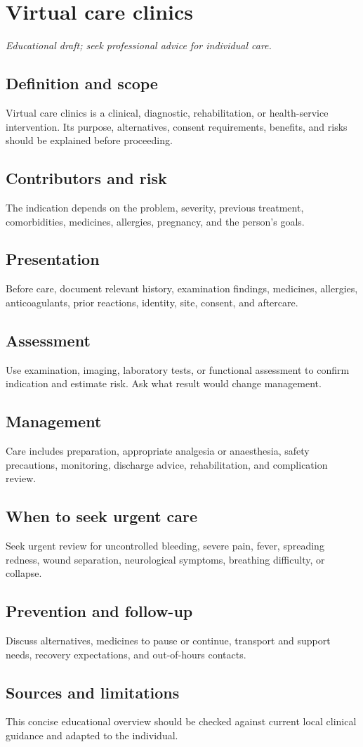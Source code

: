 \chapter{Virtual care clinics}
\medskip
\noindent\textit{Educational draft; seek professional advice for individual care.}

\section*{Definition and scope}
Virtual care clinics is a clinical, diagnostic, rehabilitation, or health-service intervention. Its purpose, alternatives, consent requirements, benefits, and risks should be explained before proceeding.

\section*{Contributors and risk}
The indication depends on the problem, severity, previous treatment, comorbidities, medicines, allergies, pregnancy, and the person’s goals.

\section*{Presentation}
Before care, document relevant history, examination findings, medicines, allergies, anticoagulants, prior reactions, identity, site, consent, and aftercare.

\section*{Assessment}
Use examination, imaging, laboratory tests, or functional assessment to confirm indication and estimate risk. Ask what result would change management.

\section*{Management}
Care includes preparation, appropriate analgesia or anaesthesia, safety precautions, monitoring, discharge advice, rehabilitation, and complication review.

\section*{When to seek urgent care}
Seek urgent review for uncontrolled bleeding, severe pain, fever, spreading redness, wound separation, neurological symptoms, breathing difficulty, or collapse.

\section*{Prevention and follow-up}
Discuss alternatives, medicines to pause or continue, transport and support needs, recovery expectations, and out-of-hours contacts.

\section*{Sources and limitations}
This concise educational overview should be checked against current local clinical guidance and adapted to the individual.
